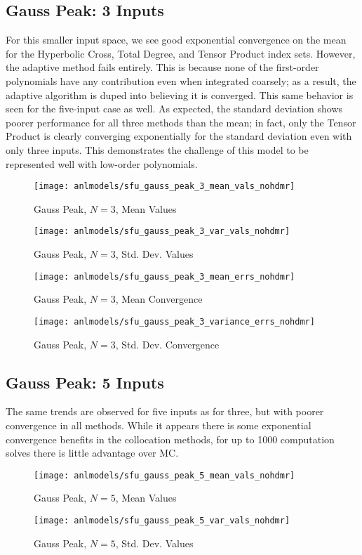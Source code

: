 \subsection{Gauss Peak: 3 Inputs}
For this smaller input space, we see good exponential convergence on the mean for the Hyperbolic Cross, Total
Degree, and Tensor Product index sets.  However, the adaptive method fails entirely.  This is because none of
the first-order polynomials have any contribution even when integrated coarsely; as a result, the adaptive
algorithm is duped into believing it is converged.  This same behavior is seen for the five-input case as
well.  As expected, the standard deviation shows poorer performance for all three methods than the mean; in
fact, only the Tensor Product is clearly converging exponentially for the standard deviation even with only three inputs.
This demonstrates the challenge of this model to be represented well with low-order polynomials.
\begin{figure}[H]
  \centering
  \texttt{[image: anlmodels/sfu\_gauss\_peak\_3\_mean\_vals\_nohdmr]}
  \caption{Gauss Peak, $N=3$, Mean Values}
  \label{fig:gauss peak mean values 3}
\end{figure}
\begin{figure}[H]
  \centering
  \texttt{[image: anlmodels/sfu\_gauss\_peak\_3\_var\_vals\_nohdmr]}
  \caption{Gauss Peak, $N=3$, Std. Dev. Values}
  \label{fig:gauss peak var values 3}
\end{figure}

\begin{figure}[H]
  \centering
  \texttt{[image: anlmodels/sfu\_gauss\_peak\_3\_mean\_errs\_nohdmr]}
  \caption{Gauss Peak, $N=3$, Mean Convergence}
  \label{fig:gauss peak mean errors 3}
\end{figure}
\begin{figure}[H]
  \centering
  \texttt{[image: anlmodels/sfu\_gauss\_peak\_3\_variance\_errs\_nohdmr]}
  \caption{Gauss Peak, $N=3$, Std. Dev. Convergence}
  \label{fig:gauss peak var errors 3}
\end{figure}

\subsection{Gauss Peak: 5 Inputs}
The same trends are observed for five inputs as for three, but with poorer convergence in all methods.  While
it appears there is some exponential convergence benefits in the collocation methods, for up to 1000 computation solves
there is little advantage over MC.
\begin{figure}[H]
  \centering
  \texttt{[image: anlmodels/sfu\_gauss\_peak\_5\_mean\_vals\_nohdmr]}
  \caption{Gauss Peak, $N=5$, Mean Values}
  \label{fig:gauss peak mean values 5}
\end{figure}
\begin{figure}[H]
  \centering
  \texttt{[image: anlmodels/sfu\_gauss\_peak\_5\_var\_vals\_nohdmr]}
  \caption{Gauss Peak, $N=5$, Std. Dev. Values}
  \label{fig:gauss peak var values 5}
\end{figure}

